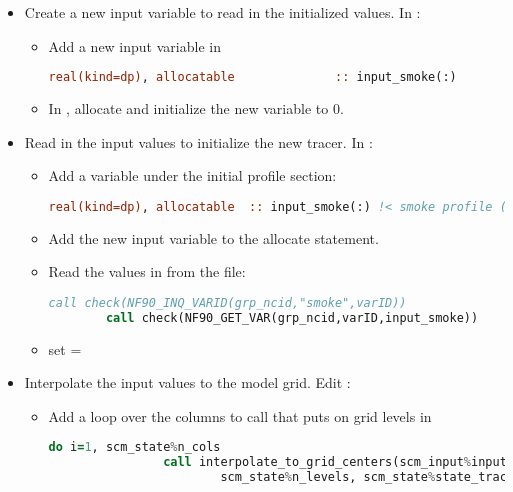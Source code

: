 \begin{enumerate}
\begin{itemize}
	\item Create a new input variable to read in the initialized values. In :
		\begin{itemize}
		\item Add a new input variable in 
		\begin{lstlisting}[language = Fortran]
		real(kind=dp), allocatable              :: input_smoke(:)
		\end{lstlisting}
		\item In , allocate and initialize the new variable to 0.
		\end{itemize}
	\item Read in the input values to initialize the new tracer. In :
		\begin{itemize}
		\item Add a variable under the initial profile section:
		\begin{lstlisting}[language = Fortran]
		real(kind=dp), allocatable  :: input_smoke(:) !< smoke profile (fraction)
		\end{lstlisting}
		\item Add the new input variable to the allocate statement.
		\item Read the values in from the file:
		\begin{lstlisting}[language = Fortran]
		call check(NF90_INQ_VARID(grp_ncid,"smoke",varID))
		call check(NF90_GET_VAR(grp_ncid,varID,input_smoke))
		\end{lstlisting}
		\item set  = 
		\end{itemize}
	\item Interpolate the input values to the model grid. Edit :
		\begin{itemize}
		\item Add a loop over the columns to call  that puts  on grid levels in 
		\begin{lstlisting}[language = Fortran]
		do i=1, scm_state%n_cols
      			call interpolate_to_grid_centers(scm_input%input_nlev, scm_input%input_pres, scm_input%input_smoke, scm_state%pres_l(i,1,:), &
        				scm_state%n_levels, scm_state%state_tracer(i,1,:,scm_state%smoke_index,1), last_index_init, 1)

\end{lstlisting}
\end{itemize}
\end{itemize}
\end{enumerate}
